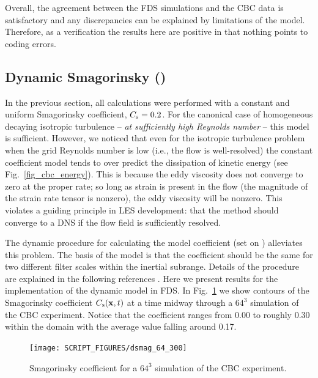 \documentclass[11pt]{book}
\begin{document}
Overall, the agreement between the FDS simulations and the CBC data is satisfactory and any discrepancies can be explained by limitations of the model.  Therefore, as a verification the results here are positive in that nothing points to coding errors.




\clearpage

\subsection{Dynamic Smagorinsky (\texorpdfstring{}{dsmag})}
\label{dynamic_smagorinsky_model}

In the previous section, all calculations were performed with a constant and uniform Smagorinsky coefficient, $C_{\rm s} = 0.2$.  For the canonical case of homogeneous decaying isotropic turbulence -- \emph{at sufficiently high Reynolds number} -- this model is sufficient.  However, we noticed that even for the isotropic turbulence problem when the grid Reynolds number is low (i.e., the flow is well-resolved) the constant coefficient model tends to over predict the dissipation of kinetic energy (see Fig.~\ref{fig_cbc_energy}).  This is because the eddy viscosity does not converge to zero at the proper rate; so long as strain is present in the flow (the magnitude of the strain rate tensor is nonzero), the eddy viscosity will be nonzero.  This violates a guiding principle in LES development: that the method should converge to a DNS if the flow field is sufficiently resolved.

The dynamic procedure for calculating the model coefficient (set  on ) alleviates this problem.  The basis of the model is that the coefficient should be the same for two different filter scales within the inertial subrange.  Details of the procedure are explained in the following references \cite{Germano:1991,PinoMartin:2000,Moin:1991,Lund:1997,FDS_Math_Guide}.  Here we present results for the implementation of the dynamic model in FDS.  In Fig.~\ref{fig_c_smag} we show contours of the Smagorinsky coefficient $C_{\rm s}(\mathbf{x},t)$ at a time midway through a $64^3$ simulation of the CBC experiment.  Notice that the coefficient ranges from 0.00 to roughly 0.30 within the domain with the average value falling around 0.17.

\begin{figure}[t]
\centering
\texttt{[image: SCRIPT\_FIGURES/dsmag\_64\_300]}
\caption[Dynamic Smagorinsky coefficient]{Smagorinsky coefficient for a $64^3$ simulation of the CBC experiment.}
\label{fig_c_smag}
\end{figure}
\end{document}
